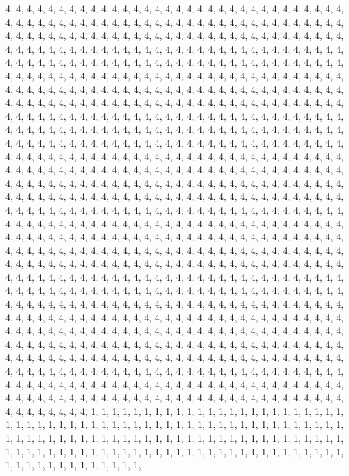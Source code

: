 \documentclass[
]{article}
\begin{document}
\begin{Schunk}
\begin{Soutput}
4, 4, 4, 4, 4, 4, 4, 4, 4, 4, 4, 4, 4, 4, 4, 4, 4, 4, 4, 4, 4, 4, 4, 4, 4, 4, 4, 4, 4, 4, 4, 4, 4, 4, 4, 4, 4, 4, 4, 4, 4, 4, 4, 4, 4, 4, 4, 4, 4, 4, 4, 4, 4, 4, 4, 4, 4, 4, 4, 4, 4, 4, 4, 4, 4, 4, 4, 4, 4, 4, 4, 4, 4, 4, 4, 4, 4, 4, 4, 4, 4, 4, 4, 4, 4, 4, 4, 4, 4, 4, 4, 4, 4, 4, 4, 4, 4, 4, 4, 4, 4, 4, 4, 4, 4, 4, 4, 4, 4, 4, 4, 4, 4, 4, 4, 4, 4, 4, 4, 4, 4, 4, 4, 4, 4, 4, 4, 4, 4, 4, 4, 4, 4, 4, 4, 4, 4, 4, 4, 4, 4, 4, 4, 4, 4, 4, 4, 4, 4, 4, 4, 4, 4, 4, 4, 4, 4, 4, 4, 4, 4, 4, 4, 4, 4, 4, 4, 4, 4, 4, 4, 4, 4, 4, 4, 4, 4, 4, 4, 4, 4, 4, 4, 4, 4, 4, 4, 4, 4, 4, 4, 4, 4, 4, 4, 4, 4, 4, 4, 4, 4, 4, 4, 4, 4, 4, 4, 4, 4, 4, 4, 4, 4, 4, 4, 4, 4, 4, 4, 4, 4, 4, 4, 4, 4, 4, 4, 4, 4, 4, 4, 4, 4, 4, 4, 4, 4, 4, 4, 4, 4, 4, 4, 4, 4, 4, 4, 4, 4, 4, 4, 4, 4, 4, 4, 4, 4, 4, 4, 4, 4, 4, 4, 4, 4, 4, 4, 4, 4, 4, 4, 4, 4, 4, 4, 4, 4, 4, 4, 4, 4, 4, 4, 4, 4, 4, 4, 4, 4, 4, 4, 4, 4, 4, 4, 4, 4, 4, 4, 4, 4, 4, 4, 4, 4, 4, 4, 4, 4, 4, 4, 4, 4, 4, 4, 4, 4, 4, 4, 4, 4, 4, 4, 4, 4, 4, 4, 4, 4, 4, 4, 4, 4, 4, 4, 4, 4, 4, 4, 4, 4, 4, 4, 4, 4, 4, 4, 4, 4, 4, 4, 4, 4, 4, 4, 4, 4, 4, 4, 4, 4, 4, 4, 4, 4, 4, 4, 4, 4, 4, 4, 4, 4, 4, 4, 4, 4, 4, 4, 4, 4, 4, 4, 4, 4, 4, 4, 4, 4, 4, 4, 4, 4, 4, 4, 4, 4, 4, 4, 4, 4, 4, 4, 4, 4, 4, 4, 4, 4, 4, 4, 4, 4, 4, 4, 4, 4, 4, 4, 4, 4, 4, 4, 4, 4, 4, 4, 4, 4, 4, 4, 4, 4, 4, 4, 4, 4, 4, 4, 4, 4, 4, 4, 4, 4, 4, 4, 4, 4, 4, 4, 4, 4, 4, 4, 4, 4, 4, 4, 4, 4, 4, 4, 4, 4, 4, 4, 4, 4, 4, 4, 4, 4, 4, 4, 4, 4, 4, 4, 4, 4, 4, 4, 4, 4, 4, 4, 4, 4, 4, 4, 4, 4, 4, 4, 4, 4, 4, 4, 4, 4, 4, 4, 4, 4, 4, 4, 4, 4, 4, 4, 4, 4, 4, 4, 4, 4, 4, 4, 4, 4, 4, 4, 4, 4, 4, 4, 4, 4, 4, 4, 4, 4, 4, 4, 4, 4, 4, 4, 4, 4, 4, 4, 4, 4, 4, 4, 4, 4, 4, 4, 4, 4, 4, 4, 4, 4, 4, 4, 4, 4, 4, 4, 4, 4, 4, 4, 4, 4, 4, 4, 4, 4, 4, 4, 4, 4, 4, 4, 4, 4, 4, 4, 4, 4, 4, 4, 4, 4, 4, 4, 4, 4, 4, 4, 4, 4, 4, 4, 4, 4, 4, 4, 4, 4, 4, 4, 4, 4, 4, 4, 4, 4, 4, 4, 4, 4, 4, 4, 4, 4, 4, 4, 4, 4, 4, 4, 4, 4, 4, 4, 4, 4, 4, 4, 4, 4, 4, 4, 4, 4, 4, 4, 4, 4, 4, 4, 4, 4, 4, 4, 4, 4, 4, 4, 4, 4, 4, 4, 4, 4, 4, 4, 4, 4, 4, 4, 4, 4, 4, 4, 4, 4, 4, 4, 4, 4, 4, 4, 4, 4, 4, 4, 4, 4, 4, 4, 4, 4, 4, 4, 4, 4, 4, 4, 4, 4, 4, 4, 4, 4, 4, 4, 4, 4, 4, 4, 4, 4, 4, 4, 4, 4, 4, 4, 4, 4, 4, 4, 4, 4, 4, 4, 4, 4, 4, 4, 4, 4, 4, 4, 4, 4, 4, 4, 4, 4, 4, 4, 4, 4, 4, 4, 4, 4, 4, 4, 4, 4, 4, 4, 4, 4, 4, 4, 4, 4, 4, 4, 4, 4, 4, 4, 4, 4, 4, 4, 4, 4, 4, 4, 4, 4, 4, 4, 4, 4, 4, 4, 4, 4, 4, 4, 4, 4, 4, 4, 4, 4, 4, 4, 4, 4, 4, 4, 4, 4, 4, 4, 4, 4, 4, 4, 4, 4, 4, 4, 4, 4, 4, 4, 4, 4, 4, 4, 4, 4, 4, 4, 4, 4, 4, 4, 4, 4, 4, 4, 4, 4, 4, 4, 4, 4, 4, 4, 4, 4, 4, 4, 4, 4, 4, 4, 4, 4, 4, 4, 4, 4, 4, 4, 4, 4, 4, 4, 4, 4, 4, 4, 4, 4, 4, 4, 4, 4, 4, 4, 4, 4, 4, 4, 4, 4, 4, 4, 4, 4, 4, 4, 4, 4, 4, 4, 4, 4, 4, 4, 4, 4, 4, 4, 4, 4, 4, 4, 4, 4, 4, 4, 4, 4, 4, 4, 4, 4, 4, 4, 4, 4, 4, 4, 4, 4, 4, 4, 4, 4, 4, 4, 4, 4, 4, 4, 4, 4, 4, 4, 4, 4, 4, 4, 4, 4, 4, 4, 4, 4, 4, 4, 4, 4, 4, 4, 4, 4, 4, 4, 4, 4, 4, 4, 4, 4, 4, 4, 4, 4, 4, 4, 4, 4, 4, 4, 4, 4, 4, 4, 4, 1, 1, 1, 1, 1, 1, 1, 1, 1, 1, 1, 1, 1, 1, 1, 1, 1, 1, 1, 1, 1, 1, 1, 1, 1, 1, 1, 1, 1, 1, 1, 1, 1, 1, 1, 1, 1, 1, 1, 1, 1, 1, 1, 1, 1, 1, 1, 1, 1, 1, 1, 1, 1, 1, 1, 1, 1, 1, 1, 1, 1, 1, 1, 1, 1, 1, 1, 1, 1, 1, 1, 1, 1, 1, 1, 1, 1, 1, 1, 1, 1, 1, 1, 1, 1, 1, 1, 1, 1, 1, 1, 1, 1, 1, 1, 1, 1, 1, 1, 1, 1, 1, 1, 1, 1, 1, 1, 1, 1, 1, 1, 1, 1, 1, 1, 1, 1, 1, 1, 1, 1, 1, 1, 1, 1, 1, 1, 1, 1, 1, 1, 1, 1, 
\end{Soutput}
\end{Schunk}
\end{document}
